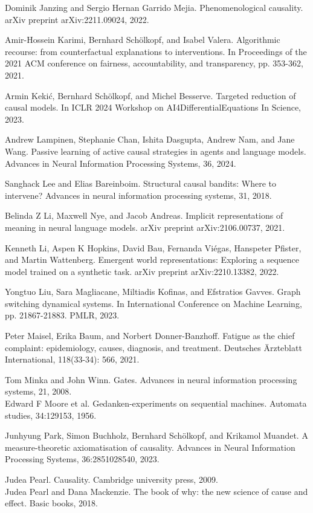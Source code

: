 \documentclass[10pt]{article}
\begin{document}
Dominik Janzing and Sergio Hernan Garrido Mejia. Phenomenological causality. arXiv preprint arXiv:2211.09024, 2022.

Amir-Hossein Karimi, Bernhard Schölkopf, and Isabel Valera. Algorithmic recourse: from counterfactual explanations to interventions. In Proceedings of the 2021 ACM conference on fairness, accountability, and transparency, pp. 353-362, 2021.

Armin Kekić, Bernhard Schölkopf, and Michel Besserve. Targeted reduction of causal models. In ICLR 2024 Workshop on AI4DifferentialEquations In Science, 2023.

Andrew Lampinen, Stephanie Chan, Ishita Dasgupta, Andrew Nam, and Jane Wang. Passive learning of active causal strategies in agents and language models. Advances in Neural Information Processing Systems, 36, 2024.

Sanghack Lee and Elias Bareinboim. Structural causal bandits: Where to intervene? Advances in neural information processing systems, 31, 2018.

Belinda Z Li, Maxwell Nye, and Jacob Andreas. Implicit representations of meaning in neural language models. arXiv preprint arXiv:2106.00737, 2021.

Kenneth Li, Aspen K Hopkins, David Bau, Fernanda Viégas, Hanspeter Pfister, and Martin Wattenberg. Emergent world representations: Exploring a sequence model trained on a synthetic task. arXiv preprint arXiv:2210.13382, 2022.

Yongtuo Liu, Sara Magliacane, Miltiadis Kofinas, and Efstratios Gavves. Graph switching dynamical systems. In International Conference on Machine Learning, pp. 21867-21883. PMLR, 2023.

Peter Maisel, Erika Baum, and Norbert Donner-Banzhoff. Fatigue as the chief complaint: epidemiology, causes, diagnosis, and treatment. Deutsches Ärzteblatt International, 118(33-34): 566, 2021.

Tom Minka and John Winn. Gates. Advances in neural information processing systems, 21, 2008.\\
Edward F Moore et al. Gedanken-experiments on sequential machines. Automata studies, 34:129153, 1956.

Junhyung Park, Simon Buchholz, Bernhard Schölkopf, and Krikamol Muandet. A measure-theoretic axiomatisation of causality. Advances in Neural Information Processing Systems, 36:2851028540, 2023.

Judea Pearl. Causality. Cambridge university press, 2009.\\
Judea Pearl and Dana Mackenzie. The book of why: the new science of cause and effect. Basic books, 2018.
\end{document}
